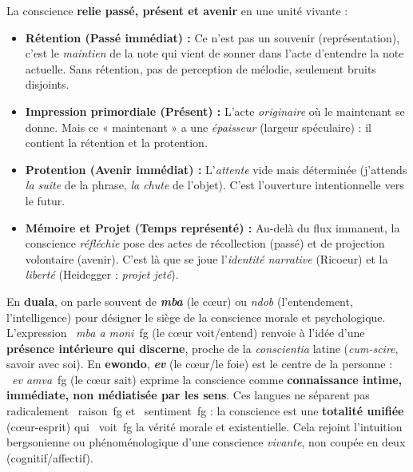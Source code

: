 \documentclass[11pt]{article}
\begin{document}
\begin{propriete}
La conscience \textbf{relie passé, présent et avenir} en une unité vivante :
\begin{itemize}
    \item \textbf{Rétention (Passé immédiat) :} Ce n'est pas un souvenir (représentation), c'est le \emph{maintien} de la note qui vient de sonner dans l'acte d'entendre la note actuelle. Sans rétention, pas de perception de mélodie, seulement bruits disjoints.
    \item \textbf{Impression primordiale (Présent) :} L'acte \emph{originaire} où le maintenant se donne. Mais ce « maintenant » a une \emph{épaisseur} (largeur spéculaire) : il contient la rétention et la protention.
    \item \textbf{Protention (Avenir immédiat) :} L'\emph{attente} vide mais déterminée (j'attends \emph{la suite} de la phrase, \emph{la chute} de l'objet). C'est l'ouverture intentionnelle vers le futur.
    \item \textbf{Mémoire et Projet (Temps représenté) :} Au-delà du flux immanent, la conscience \emph{réfléchie} pose des actes de récollection (passé) et de projection volontaire (avenir). C'est là que se joue l'\emph{identité narrative} (Ricoeur) et la \emph{liberté} (Heidegger : \emph{projet jeté}).
\end{itemize}
\end{propriete}

\begin{savaistu}
En \textbf{duala}, on parle souvent de \textbf{\emph{mba}} (le cœur) ou \emph{ndob} (l'entendement, l'intelligence) pour désigner le siège de la conscience morale et psychologique. L'expression \og~\emph{mba a moni}~fg{} (le cœur voit/entend) renvoie à l'idée d'une \textbf{présence intérieure qui discerne}, proche de la \emph{conscientia} latine (\emph{cum-scire}, savoir avec soi).
En \textbf{ewondo}, \textbf{\emph{ev}} (le cœur/le foie) est le centre de la personne : \og~\emph{ev amva}~fg{} (le cœur sait) exprime la conscience comme \textbf{connaissance intime, immédiate, non médiatisée par les sens}.
Ces langues ne séparent pas radicalement \og~raison~fg{} et \og~sentiment~fg{} : la conscience est une \textbf{totalité unifiée} (cœur-esprit) qui \og~voit~fg{} la vérité morale et existentielle. Cela rejoint l'intuition bergsonienne ou phénoménologique d'une conscience \emph{vivante}, non coupée en deux (cognitif/affectif).
\end{savaistu}
\end{document}
